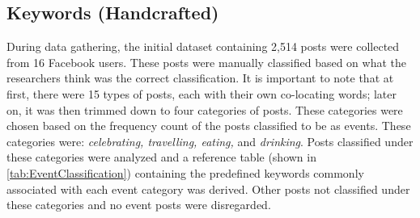 \subsection{Keywords (Handcrafted)}
During data gathering, the initial dataset containing 2,514 posts were collected from 16 Facebook users. These posts were manually classified based on what the researchers think was the correct classification. It is important to note that at first, there were 15 types of posts, each with their own co-locating words; later on, it was then trimmed down to four categories of posts. These categories were chosen based on the frequency count of the posts classified to be as events. These categories were: \textit{celebrating, travelling, eating,} and \textit{drinking}. Posts classified under these categories were analyzed and a reference table (shown in \ref{tab:EventClassification}) containing the predefined keywords commonly associated with each event category was derived. Other posts not classified under these categories and no event posts were disregarded.


